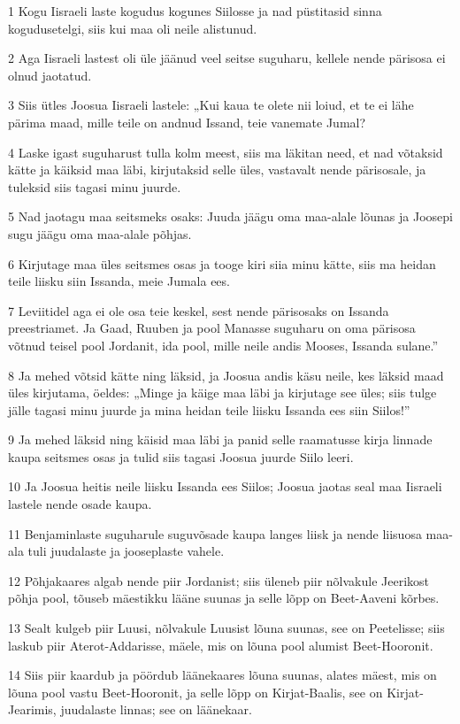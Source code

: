 \par 1 Kogu Iisraeli laste kogudus kogunes Siilosse ja nad püstitasid sinna kogudusetelgi, siis kui maa oli neile alistunud.
\par 2 Aga Iisraeli lastest oli üle jäänud veel seitse suguharu, kellele nende pärisosa ei olnud jaotatud.
\par 3 Siis ütles Joosua Iisraeli lastele: „Kui kaua te olete nii loiud, et te ei lähe pärima maad, mille teile on andnud Issand, teie vanemate Jumal?
\par 4 Laske igast suguharust tulla kolm meest, siis ma läkitan need, et nad võtaksid kätte ja käiksid maa läbi, kirjutaksid selle üles, vastavalt nende pärisosale, ja tuleksid siis tagasi minu juurde.
\par 5 Nad jaotagu maa seitsmeks osaks: Juuda jäägu oma maa-alale lõunas ja Joosepi sugu jäägu oma maa-alale põhjas.
\par 6 Kirjutage maa üles seitsmes osas ja tooge kiri siia minu kätte, siis ma heidan teile liisku siin Issanda, meie Jumala ees.
\par 7 Leviitidel aga ei ole osa teie keskel, sest nende pärisosaks on Issanda preestriamet. Ja Gaad, Ruuben ja pool Manasse suguharu on oma pärisosa võtnud teisel pool Jordanit, ida pool, mille neile andis Mooses, Issanda sulane.”
\par 8 Ja mehed võtsid kätte ning läksid, ja Joosua andis käsu neile, kes läksid maad üles kirjutama, öeldes: „Minge ja käige maa läbi ja kirjutage see üles; siis tulge jälle tagasi minu juurde ja mina heidan teile liisku Issanda ees siin Siilos!”
\par 9 Ja mehed läksid ning käisid maa läbi ja panid selle raamatusse kirja linnade kaupa seitsmes osas ja tulid siis tagasi Joosua juurde Siilo leeri.
\par 10 Ja Joosua heitis neile liisku Issanda ees Siilos; Joosua jaotas seal maa Iisraeli lastele nende osade kaupa.
\par 11 Benjaminlaste suguharule suguvõsade kaupa langes liisk ja nende liisuosa maa-ala tuli juudalaste ja jooseplaste vahele.
\par 12 Põhjakaares algab nende piir Jordanist; siis üleneb piir nõlvakule Jeerikost põhja pool, tõuseb mäestikku lääne suunas ja selle lõpp on Beet-Aaveni kõrbes.
\par 13 Sealt kulgeb piir Luusi, nõlvakule Luusist lõuna suunas, see on Peetelisse; siis laskub piir Aterot-Addarisse, mäele, mis on lõuna pool alumist Beet-Hooronit.
\par 14 Siis piir kaardub ja pöördub läänekaares lõuna suunas, alates mäest, mis on lõuna pool vastu Beet-Hooronit, ja selle lõpp on Kirjat-Baalis, see on Kirjat-Jearimis, juudalaste linnas; see on läänekaar.
